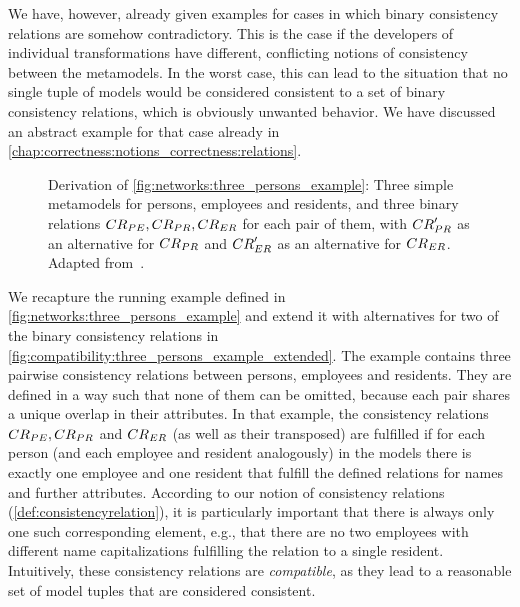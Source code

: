 We have, however, already given examples for cases in which binary consistency relations are somehow contradictory.
This is the case if the developers of individual transformations have different, conflicting notions of consistency between the metamodels.
In the worst case, this can lead to the situation that no single tuple of models would be considered consistent to a set of binary consistency relations, which is obviously unwanted behavior.
We have discussed an abstract example for that case already in \autoref{chap:correctness:notions_correctness:relations}.

\begin{figure}
    \centering
    
    \caption[Three metamodels with (in)compatible consistency relations]{Derivation of \autoref{fig:networks:three_persons_example}: Three simple metamodels for persons, employees and residents, and three binary relations $\consistencyrelation{CR}{PE}, \consistencyrelation{CR}{PR}, \consistencyrelation{CR}{ER}$ for each pair of them, with $\consistencyrelation{CR}{PR}'$ as an alternative for $\consistencyrelation{CR}{PR}$ and $\consistencyrelation{CR}{ER}'$ as an alternative for $\consistencyrelation{CR}{ER}$. Adapted from~.}
    \label{fig:compatibility:three_persons_example_extended}
\end{figure}

We recapture the running example defined in \autoref{fig:networks:three_persons_example} and extend it with alternatives for two of the binary consistency relations in \autoref{fig:compatibility:three_persons_example_extended}.
The example contains three pairwise consistency relations between persons, employees and residents.
They are defined in a way such that none of them can be omitted, because each pair shares a unique overlap in their attributes.
In that example, the consistency relations $\consistencyrelation{CR}{PE}, \consistencyrelation{CR}{PR}$ and $\consistencyrelation{CR}{ER}$ (as well as their transposed) are fulfilled if for each person (and each employee and resident analogously) in the models there is exactly one employee and one resident that fulfill the defined relations for names and further attributes.
According to our notion of consistency relations (\autoref{def:consistencyrelation}), it is particularly important that there is always only one such corresponding element, e.g., that there are no two employees with different name capitalizations fulfilling the relation to a single resident.
Intuitively, these consistency relations are \emph{compatible}, as they lead to a reasonable set of model tuples that are considered consistent.

